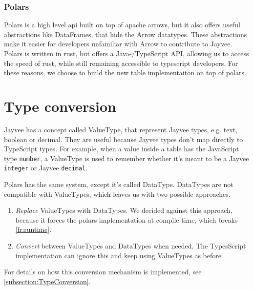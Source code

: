 \subsubsection{Polars}
\label{subsection:polars}
Polars is a high level api built on top of apache arrows, but it also offers useful abstractions like DataFrames, that hide the Arrow datatypes.
These abstractions make it easier for developers unfamiliar with Arrow to contribute to Jayvee.
Polars is written in rust, but offers a Java-/TypeScript \ac{API}, allowing us %
to access the speed of rust, %
while still remaining accessible to typescript developers.
For these reasons, we choose to build the new table implementaiton on top of polars.



\section{Type conversion}
\label{section:type_conversion}
Jayvee has a concept called ValueType, that represent Jayvee types, e.g. text, boolean or decimal.
They are useful because Jayvee types don't map directly to TypeScript types.
For example, when a value inside a table has the JavaScript type \Verb|number|, a ValueType is used to remember whether it's meant to be a Jayvee \Verb|integer| or Jayvee \Verb|decimal|.

Polars has the same system, except it's called DataType.
DataTypes are not compatible with ValueTypes, which leaves us with two possible approaches.
\begin{enumerate}
	\item \emph{Replace} ValueTypes with DataTypes.
	      We decided against this approach, because it forces the polars implementation at compile time, which breaks \ref{fr:runtime}.
	\item \emph{Convert} between ValueTypes and DataTypes when needed.
	      The TypesScript implementation can ignore this and keep using ValueTypes as before.
\end{enumerate}

For details on how this conversion mechanism is implemented, see \ref{subsection:TypeConversion}.

%
%
%


